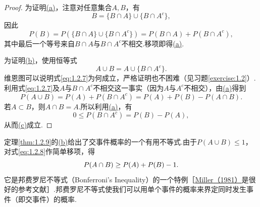 \begin{proof}
为证明\hyperref[itm:thm:1.2.9:a]{(a)}，注意对任意集合$A,B$，有
$$B=\{B\cap A\}\cup\{B\cap A^c\},$$
因此
\begin{equation}\label{eq:1.2.6}
P(B)=P(\{B\cap A\}\cup\{B\cap A^c\})=P(B\cap A)+P(B\cap A^c),
\end{equation}
其中最后一个等号来自$B\cap A$与$B\cap A^c$不相交.移项即得\hyperref[itm:thm:1.2.9:a]{(a)}.

为证明\hyperref[itm:thm:1.2.9:b]{(b)}，使用恒等式
\begin{equation}\label{eq:1.2.7}A\cup B=A\cup\{B\cap A^c\}.\end{equation}
维恩图可以说明式\eqref{eq:1.2.7}为何成立，严格证明也不困难（见习题\ref{exercise:1.2}）.利用式\eqref{eq:1.2.7}及$A$与$B\cap A^c$不相交这一事实（因为$A$与$A^c$不相交），由\hyperref[itm:thm:1.2.9:a]{(a)}得到
\begin{equation}\label{eq:1.2.8}
P(A\cup B)=P(A)+P(B\cap A^c)=P(A)+P(B)-P(A\cap B).
\end{equation}
若$A\subset B$，则$A\cap B=A$.所以利用\hyperref[itm:thm:1.2.9:a]{(a)}，有
$$0\le P(B\cap A^c)=P(B)-P(A),$$
从而\hyperref[itm:thm:1.2.9:c]{(c)}成立.
\end{proof}
定理\ref{thm:1.2.9}的\hyperref[itm:thm:1.2.9:b]{(b)}给出了交事件概率的一个有用不等式.由于$P(A\cup B)\le1$，对式\eqref{eq:1.2.8}作简单移项，得
\begin{equation}\label{eq:1.2.9}\index{SI0560@Bonferroni}P(A\cap B)\ge P(A)+P(B)-1.\end{equation}
它是邦费罗尼不等式（Bonferroni's Inequality）的一个特例［\hyperref[bib:source221]{Miller（1981）}是很好的参考文献］.邦费罗尼不等式使我们可以用单个事件的概率来界定同时发生事件（即交事件）的概率.


